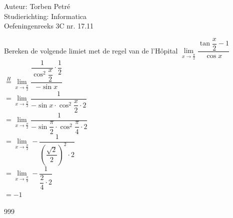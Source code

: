 \documentclass[a4paper]{article}
\begin{document}
  
\noindent \large Auteur: Torben Petré \\
\noindent \large Studierichting: Informatica\\
\noindent \large Oefeningenreeks 3C nr. 17.11\\

\medskip

\normalsize

Bereken de volgende limiet met de regel van de l'Hôpital $\lim\limits_{x \rightarrow \tfrac{\pi}{2}} \dfrac{\tan \dfrac{x}{2} - 1}{\cos x}$\\

$\overset{H}{=} \lim\limits_{x \rightarrow \tfrac{\pi}{2}} \dfrac{\dfrac{1}{\cos^2\dfrac{x}{2}} \cdot \dfrac{1}{2}}{-\sin x}$\\

$ =\lim\limits_{x \rightarrow \tfrac{\pi}{2}} \dfrac{1}{-\sin x \cdot \cos^2 \dfrac{x}{2} \cdot 2}$\\

$ =\lim\limits_{x \rightarrow \tfrac{\pi}{2}} \dfrac{1}{-\sin \dfrac{\pi}{2} \cdot \cos^2 \dfrac{\pi}{4} \cdot 2}$\\

$ =\lim\limits_{x \rightarrow \tfrac{\pi}{2}} -\dfrac{1}{\left(\dfrac{\sqrt{2}}{2}\right)^2 \cdot 2}$\\

$ =\lim\limits_{x \rightarrow \tfrac{\pi}{2}} -\dfrac{1}{\dfrac{2}{4} \cdot 2}$\\

$ =-1$

\begin{thebibliography}{999}
\end{thebibliography}
\end{document}
